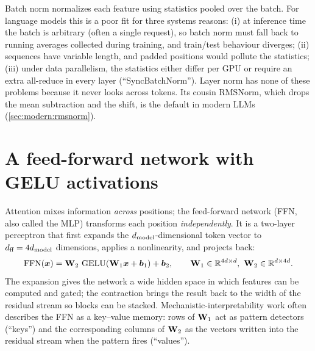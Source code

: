 \begin{deepdive}
Batch norm normalizes each feature using statistics pooled over the batch. For language models
this is a poor fit for three systems reasons: (i) at inference time the batch is arbitrary
(often a single request), so batch norm must fall back to running averages collected during
training, and train/test behaviour diverges; (ii) sequences have variable length, and padded
positions would pollute the statistics; (iii) under data parallelism, the statistics either
differ per GPU or require an extra all-reduce in every layer (``SyncBatchNorm''). Layer norm has
none of these problems because it never looks across tokens. Its cousin RMSNorm, which drops the
mean subtraction and the shift, is the default in modern LLMs (\cref{sec:modern:rmsnorm}).
\end{deepdive}

\section{A feed-forward network with GELU activations}\label{sec:gpt:ffn}

Attention mixes information \emph{across} positions; the feed-forward network (FFN, also called
the MLP) transforms each position \emph{independently}. It is a two-layer perceptron that first
expands the $d_{\text{model}}$-dimensional token vector to $d_{\text{ff}}=4d_{\text{model}}$ dimensions, applies a
nonlinearity, and projects back:
\begin{equation}
\mathrm{FFN}(\bm{x}) = \mathbf{W}_2\,\operatorname{GELU}(\mathbf{W}_1\bm{x}+\bm{b}_1)+\bm{b}_2,\qquad
\mathbf{W}_1\in\mathbb{R}^{4d\times d},\ \mathbf{W}_2\in\mathbb{R}^{d\times 4d}.
\label{eq:gpt:ffn}
\end{equation}
The expansion gives the network a wide hidden space in which features can be computed and
gated; the contraction brings the result back to the width of the residual stream so blocks can be
stacked. Mechanistic-interpretability work often describes the FFN as a key--value memory: rows of
$\mathbf{W}_1$ act as pattern detectors (``keys'') and the corresponding columns of $\mathbf{W}_2$ as the
vectors written into the residual stream when the pattern fires (``values'').

